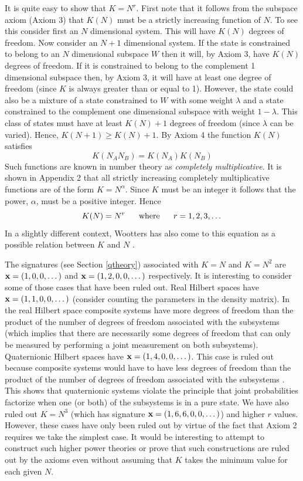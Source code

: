 \documentclass[10pt,twocolumn]{article}
\begin{document}
It is quite easy to show that $K=N^r$.  First note that it
follows from the subspace axiom (Axiom 3) that $K(N)$ must be a strictly
increasing function of $N$.  To see this consider first an $N$
dimensional system. This will have $K(N)$ degrees of freedom. Now
consider an $N+1$ dimensional system. If the state is constrained to
belong to an $N$ dimensional subspace $W$ then it will, by Axiom 3, have
$K(N)$ degrees of freedom. If it is constrained to belong to the
complement 1 dimensional subspace then, by Axiom 3, it will have at
least one degree of freedom (since $K$ is always greater than or equal
to 1).  However, the state could also be a mixture of a state
constrained to $W$ with some weight $\lambda$ and a state constrained to
the complement one dimensional subspace with weight $1-\lambda$.  This
class of states must have at least $K(N)+1$ degrees of freedom (since
$\lambda$ can be varied).  Hence, $K(N+1)\geq K(N)+1$.  By Axiom 4 the
function $K(N)$ satisfies
\begin{equation}
K(N_AN_B)=K(N_A)K(N_B)
\end{equation}
Such functions are known in number theory as {\it completely
multiplicative}.  It is shown in Appendix 2 that all strictly
increasing completely multiplicative functions are of the form
$K=N^\alpha$.  Since $K$ must be an integer it follows that the power,
$\alpha$, must be a positive integer. Hence
\begin{equation}
K(N)=N^r {\rm ~~~~~where~~~~~} r=1,2,3,\dots
\end{equation}
In a slightly different context, Wootters has also come to this equation
as a possible relation between $K$ and $N$ \cite{wootters}.

The signatures (see Section \ref{qtheory}) associated with $K=N$ and
$K=N^2$ are ${\bf x}=(1,0,0,\dots)$ and ${\bf x}=(1,2,0,0,\dots)$ respectively.
It is interesting to consider some of those cases that have been ruled out.
Real Hilbert spaces have ${\bf x}=(1,1,0,0,\dots)$ (consider counting
the parameters in the density matrix).  In the real Hilbert space composite
systems have more degrees of freedom than the product of the number of
degrees of freedom associated with the subsystems (which implies that
there are necessarily some degrees of freedom that can only be measured
by performing a joint measurement on both subsystems).
Quaternionic Hilbert spaces have
${\bf x}=(1,4,0,0,\dots)$.  This case is ruled out because
composite systems would have to have less degrees of
freedom than the product of the number of degrees of freedom associated
with the subsystems \cite{fuchs}. This shows that quaternionic systems
violate the principle that joint probabilities factorize when one (or
both) of the subsystems is in a pure state.
We have also ruled out $K=N^3$ (which
has signature ${\bf x}=(1,6,6,0,0,\dots)$) and
higher $r$ values.  However, these cases have only been ruled out by
virtue of the fact that Axiom 2 requires we take the simplest case.  It
would be interesting to attempt to construct such higher power theories
or prove that such constructions are ruled out by the axioms even
without assuming that $K$ takes the minimum value for each given $N$.
\end{document}
